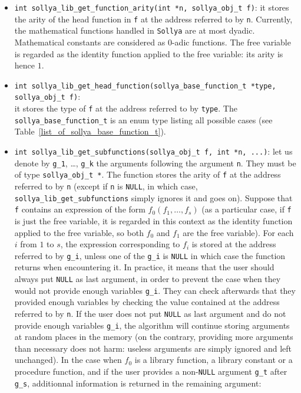 \documentclass[a4paper]{article}
\newcommand{\sollya}{\texttt{Sollya}\xspace}
\begin{document}
\begin{itemize}
\item \verb|int sollya_lib_get_function_arity(int *n, sollya_obj_t f)|: it stores the arity of the head function in \texttt{f} at the address referred to by \texttt{n}. Currently, the mathematical functions handled in \sollya are at most dyadic. Mathematical constants are considered as 0-adic functions. The free variable is regarded as the identity function applied to the free variable: its arity is hence $1$.
\item \verb|int sollya_lib_get_head_function(sollya_base_function_t *type, sollya_obj_t f)|:\\
it stores the type of \texttt{f} at the address referred to by \texttt{type}. The \texttt{sollya\_base\_function\_t} is an enum type listing all possible cases (see Table~\ref{list_of_sollya_base_function_t}).
\item \verb|int sollya_lib_get_subfunctions(sollya_obj_t f, int *n, ...)|: let us denote by \texttt{g\_1}, \dots, \texttt{g\_k} the arguments following the argument \texttt{n}. They must be of type \verb|sollya_obj_t *|. The function stores the arity of \texttt{f} at the address referred to by \texttt{n} (except if \texttt{n} is \verb|NULL|, in which case, \verb|sollya_lib_get_subfunctions| simply ignores it and goes on). Suppose that \texttt{f} contains an expression of the form $f_0(f_1,\dots,f_s)$ (as a particular case, if \texttt{f} is just the free variable, it is regarded in this context as the identity function applied to the free variable, so both $f_0$ and $f_1$ are the free variable). For each $i$ from $1$ to $s$, the expression corresponding to $f_i$ is stored at the address referred to by \texttt{g\_i}, unless one of the \texttt{g\_i} is \texttt{NULL} in which case the function returns when encountering it. In practice, it means that the user should always put \texttt{NULL} as last argument, in order to prevent the case when they would not provide enough variables \texttt{g\_i}. They can check afterwards that they provided enough variables by checking the value contained at the address referred to by \texttt{n}. If the user does not put \texttt{NULL} as last argument and do not provide enough variables \texttt{g\_i}, the algorithm will continue storing arguments at random places in the memory (on the contrary, providing more arguments than necessary does not harm: useless arguments are simply ignored and left unchanged). In the case when $f_0$ is a library function, a library constant or a procedure function, and if the user provides a non-\texttt{NULL} argument \texttt{g\_t} after \texttt{g\_s}, additionnal information is returned in the remaining argument:

\end{itemize}
\end{document}
